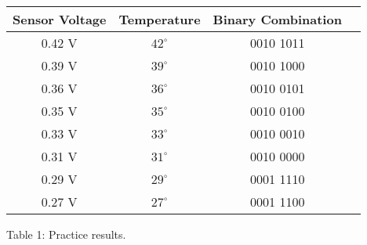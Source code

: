 \begin{center}
\begin{tabular}{c c c c}
\toprule \toprule
\hspace{40px} Sensor Voltage \hspace{40px} & \hspace{30px} Temperature \hspace{30px} & \hspace{30px} Binary Combination \hspace{30px} \\
\midrule \midrule
0.42 V & $42^{\circ}$ & 0010 1011 & \\
\midrule
0.39 V & $39^{\circ}$ & 0010 1000 & \\
\midrule
0.36 V & $36^{\circ}$ & 0010 0101 & \\
\midrule
0.35 V & $35^{\circ}$ & 0010 0100 & \\
\midrule
0.33 V & $33^{\circ}$ & 0010 0010 & \\
\midrule
0.31 V & $31^{\circ}$ & 0010 0000 & \\
\midrule
0.29 V & $29^{\circ}$ & 0001 1110 & \\
\midrule
0.27 V & $27^{\circ}$ & 0001 1100 & \\
\bottomrule
\end{tabular}
\centering \linebreak \linebreak Table 1: Practice results.
\end{center}

\pagebreak